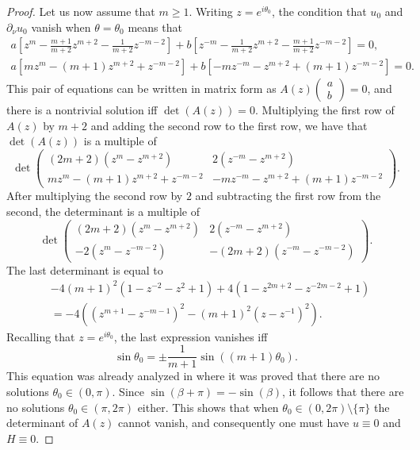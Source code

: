 \documentclass[11pt,a4paper]{amsart}
\theoremstyle{definition}
\numberwithin{equation}{section}
\newcommand{\p}{\partial}
\begin{document}
\begin{proof}
Let us now assume that $m \geq 1$. Writing $z = e^{i\theta_0}$, the condition that $u_0$ and $\p_{\nu} u_0$ vanish when $\theta=\theta_0$ means that 
\begin{gather*}
a \left[ z^m -\frac{m+1}{m+2} z^{m+2} - \frac{1}{m+2} z^{-m-2} \right]  + b \left[ z^{-m} - \frac{1}{m+2} z^{m+2} - \frac{m+1}{m+2} z^{-m-2} \right] = 0, \\
a \left[ m z^m - (m+1) z^{m+2} + z^{-m-2} \right]  + b \left[ -m z^{-m} -  z^{m+2} + (m+1) z^{-m-2} \right] = 0.
\end{gather*}
This pair of equations can be written in matrix form as $A(z) \left( \begin{array}{c} a \\ b \end{array} \right) = 0$, and there is a nontrivial solution iff $\det(A(z)) = 0$. Multiplying the first row of $A(z)$ by $m+2$ and adding the second row to the first row, we have that $\det(A(z))$ is a multiple of 
\[
\det \left( \begin{array}{cc} (2m+2) (z^m - z^{m+2})  & 2 (z^{-m} - z^{m+2})  \\
 m z^m - (m+1) z^{m+2} + z^{-m-2} & -m z^{-m} -  z^{m+2} + (m+1) z^{-m-2} \end{array} \right).
\]
After multiplying the second row by $2$ and subtracting the first row from the second, the determinant is a multiple of 
\[
\det \left( \begin{array}{cc} (2m+2) (z^m - z^{m+2})  & 2 (z^{-m} - z^{m+2})  \\
 -2 (z^m - z^{-m-2}) & -(2m+2) (z^{-m} - z^{-m-2}) \end{array} \right).
\]
The last determinant is equal to 
\begin{align*}
 &-4(m+1)^2(1 - z^{-2} - z^{2} + 1) + 4(1 - z^{2m+2} - z^{-2m-2} + 1) \\
 &= -4( (z^{m+1} - z^{-m-1})^2 - (m+1)^2 (z - z^{-1})^2 ).
\end{align*}
Recalling that $z = e^{i \theta_0}$, the last expression vanishes iff 
\[
\sin \theta_0 = \pm \frac{1}{m+1} \sin((m+1)\theta_0).
\]
This equation was already analyzed in \cite[Section 5]{PaivarintaSaloVesalainen} where it was proved that there are no solutions $\theta_0 \in (0,\pi)$. Since $\sin(\beta+\pi) = -\sin(\beta)$, it follows that there are no solutions $\theta_0 \in (\pi, 2\pi)$ either. This shows that when $\theta_0 \in (0,2\pi) \setminus \{\pi\}$ the determinant of $A(z)$ cannot vanish, and consequently one must have $u \equiv 0$ and $H \equiv 0$.
\end{proof}
\end{document}
